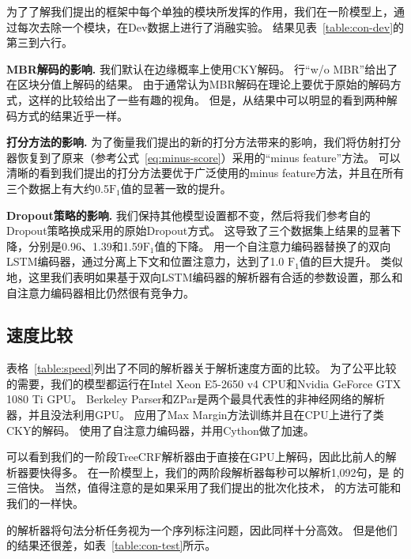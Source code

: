 为了了解我们提出的框架中每个单独的模块所发挥的作用，我们在一阶模型上，通过每次去除一个模块，在Dev数据上进行了消融实验。
结果见表~\ref{table:con-dev}的第三到六行。

\noindent\textbf{MBR解码的影响.}
我们默认在边缘概率上使用CKY解码。
行``w/o MBR''给出了在区块分值上解码的结果。
由于通常认为MBR解码在理论上要优于原始的解码方式，这样的比较给出了一些有趣的视角。
但是，从结果中可以明显的看到两种解码方式的结果近乎一样。

\noindent\textbf{打分方法的影响.}
为了衡量我们提出的新的打分方法带来的影响，我们将仿射打分器恢复到了原来\citet{stern-etal-2017-minimal}（参考公式~\ref{eq:minus-score}）采用的``minus feature''方法。
可以清晰的看到我们提出的打分方法要优于广泛使用的minus feature方法，并且在所有三个数据上有大约0.5$\mathrm{F}_1$值的显著一致的提升。

\noindent\textbf{Dropout策略的影响.}
我们保持其他模型设置都不变，然后将我们参考自\citet{dozat-etal-2017-biaffine}的Dropout策略换成\citet{stern-etal-2017-minimal}采用的原始Dropout方式。
这导致了三个数据集上结果的显著下降，分别是0.96、1.39和1.59$\mathrm{F}_1$值的下降。
\citet{kitaev-klein-2018-constituency}用一个自注意力编码器替换了\citet{stern-etal-2017-minimal}的双向LSTM编码器，通过分离上下文和位置注意力，达到了1.0 $\mathrm{F}_1$值的巨大提升。
类似地，这里我们表明如果基于双向LSTM编码器的解析器有合适的参数设置，那么和自注意力编码器相比仍然很有竞争力。



\subsection{速度比较}
表格~\ref{table:speed}列出了不同的解析器关于解析速度方面的比较。
为了公平比较的需要，我们的模型都运行在Intel Xeon E5-2650 v4 CPU和Nvidia GeForce GTX 1080 Ti GPU。
Berkeley Parser和ZPar是两个最具代表性的非神经网络的解析器，并且没法利用GPU。
\citet{stern-etal-2017-minimal}应用了Max Margin方法训练并且在CPU上进行了类CKY的解码。
\citet{kitaev-klein-2018-constituency}使用了自注意力编码器，并用Cython做了加速。

可以看到我们的一阶段TreeCRF解析器由于直接在GPU上解码，因此比前人的解析器要快得多。
在一阶模型上，我们的两阶段解析器每秒可以解析1,092句，是 \citet{kitaev-klein-2018-constituency}的三倍快。
当然，值得注意的是如果采用了我们提出的批次化技术， \citet{stern-etal-2017-minimal,kitaev-klein-2018-constituency}的方法可能和我们的一样快。

\citet{gomez-rodriguez-vilares-2018-constituent}的解析器将句法分析任务视为一个序列标注问题，因此同样十分高效。
但是他们的结果还很差，如表~\ref{table:con-test}所示。

